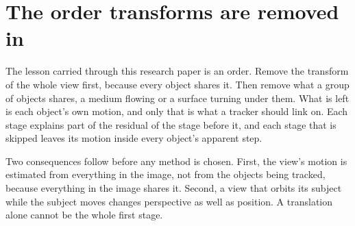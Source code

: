 \section{The order transforms are removed in}

The lesson carried through this research paper is an order. Remove the transform of the whole view first,
because every object shares it. Then remove what a group of objects shares, a medium flowing or a
surface turning under them. What is left is each object's own motion, and only that is what a
tracker should link on. Each stage explains part of the residual of the stage before it, and each
stage that is skipped leaves its motion inside every object's apparent step.

Two consequences follow before any method is chosen. First, the view's motion is estimated from
everything in the image, not from the objects being tracked, because everything in the image shares
it. Second, a view that orbits its subject while the subject moves changes perspective as well as
position. A translation alone cannot be the whole first stage.
